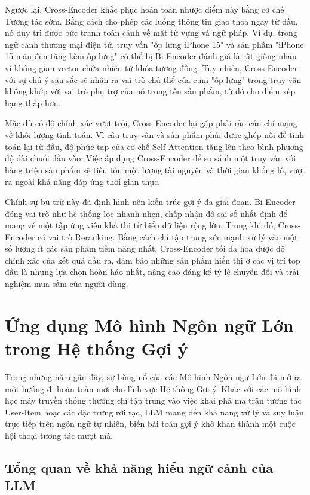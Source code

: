 Ngược lại, Cross-Encoder khắc phục hoàn toàn nhược điểm này bằng cơ chế Tương tác sớm. Bằng cách cho phép các luồng thông tin giao thoa ngay từ đầu, nó duy trì được bức tranh toàn cảnh về mặt từ vựng và ngữ pháp. Ví dụ, trong ngữ cảnh thương mại điện tử, truy vấn "ốp lưng iPhone 15" và sản phẩm "iPhone 15 màu đen tặng kèm ốp lưng" có thể bị Bi-Encoder đánh giá là rất giống nhau vì không gian vector chứa nhiều từ khóa tương đồng. Tuy nhiên, Cross-Encoder với sự chú ý sâu sắc sẽ nhận ra vai trò chủ thể của cụm "ốp lưng" trong truy vấn không khớp với vai trò phụ trợ của nó trong tên sản phẩm, từ đó cho điểm xếp hạng thấp hơn.

Mặc dù có độ chính xác vượt trội, Cross-Encoder lại gặp phải rào cản chí mạng về khối lượng tính toán. Vì câu truy vấn và sản phẩm phải được ghép nối để tính toán lại từ đầu, độ phức tạp của cơ chế Self-Attention tăng lên theo bình phương độ dài chuỗi đầu vào. Việc áp dụng Cross-Encoder để so sánh một truy vấn với hàng triệu sản phẩm sẽ tiêu tốn một lượng tài nguyên và thời gian khổng lồ, vượt ra ngoài khả năng đáp ứng thời gian thực.

Chính sự bù trừ này đã định hình nên kiến trúc gợi ý đa giai đoạn. Bi-Encoder đóng vai trò như hệ thống lọc nhanh nhẹn, chấp nhận độ sai số nhất định để mang về một tập ứng viên khả thi từ biển dữ liệu rộng lớn. Trong khi đó, Cross-Encoder có vai trò Reranking. Bằng cách chỉ tập trung sức mạnh xử lý vào một số lượng ít các sản phẩm tiềm năng nhất, Cross-Encoder tối đa hóa được độ chính xác của kết quả đầu ra, đảm bảo những sản phẩm hiển thị ở các vị trí top đầu là những lựa chọn hoàn hảo nhất, nâng cao đáng kể tỷ lệ chuyển đổi và trải nghiệm mua sắm của người dùng.

\section{Ứng dụng Mô hình Ngôn ngữ Lớn trong Hệ thống Gợi ý}

Trong những năm gần đây, sự bùng nổ của các Mô hình Ngôn ngữ Lớn đã mở ra một hướng đi hoàn toàn mới cho lĩnh vực Hệ thống Gợi ý. Khác với các mô hình học máy truyền thống thường chỉ tập trung vào việc khai phá ma trận tương tác User-Item hoặc các đặc trưng rời rạc, LLM mang đến khả năng xử lý và suy luận trực tiếp trên ngôn ngữ tự nhiên, biến bài toán gợi ý khô khan thành một cuộc hội thoại tương tác mượt mà.

\subsection{Tổng quan về khả năng hiểu ngữ cảnh của LLM}

